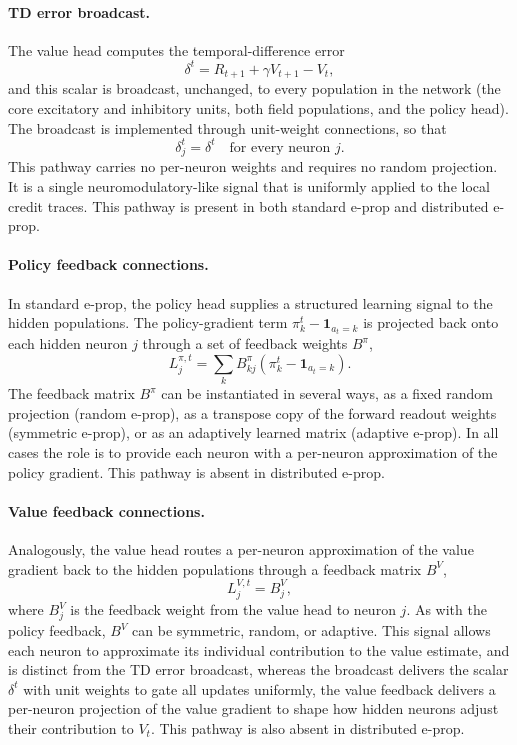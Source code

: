 \paragraph{TD error broadcast.}
The value head computes the temporal-difference error
\begin{equation}
    \delta^t = R_{t+1} + \gamma V_{t+1} - V_t,
\end{equation}
and this scalar is broadcast, unchanged, to every population in the network (the core
excitatory and inhibitory units, both field populations, and the policy head). The
broadcast is implemented through unit-weight connections, so that
\begin{equation}
    \delta^t_j = \delta^t \quad \text{for every neuron } j.
\end{equation}
This pathway carries no per-neuron weights and requires no random projection. It is a
single neuromodulatory-like signal that is uniformly applied to the local credit traces. This pathway is present in both standard e-prop and
distributed e-prop.

\paragraph{Policy feedback connections.}
In standard e-prop, the policy head supplies a structured learning signal to the hidden
populations. The policy-gradient term $\pi^t_k - \mathbf{1}_{a_t = k}$ is projected
back onto each hidden neuron $j$ through a set of feedback weights $B^\pi$,
\begin{equation}
    L^{\pi,t}_j = \sum_k B^\pi_{kj} \left( \pi^t_k - \mathbf{1}_{a_t = k} \right).
\end{equation}
The feedback matrix $B^\pi$ can be instantiated in several ways, as a fixed random
projection (random e-prop), as a transpose copy of the forward readout weights
(symmetric e-prop), or as an adaptively learned matrix (adaptive e-prop). In all cases the role is to provide each neuron with a per-neuron approximation of the policy gradient.
This pathway is absent in distributed e-prop.

\paragraph{Value feedback connections.}
Analogously, the value head routes a per-neuron approximation of the value gradient
back to the hidden populations through a feedback matrix $B^V$,
\begin{equation}
    L^{V,t}_j = 
        B^V_j,
\end{equation}
where $B^V_j$ is the feedback weight from the value head to neuron $j$. As with the
policy feedback, $B^V$ can be symmetric, random, or adaptive. This signal allows
each neuron to approximate its individual contribution to the value estimate, and is
distinct from the TD error broadcast, whereas the broadcast delivers the scalar
$\delta^t$ with unit weights to gate all updates uniformly, the value feedback
delivers a per-neuron projection of the value gradient to shape how hidden neurons
adjust their contribution to $V_t$. This pathway is also absent in distributed e-prop.

